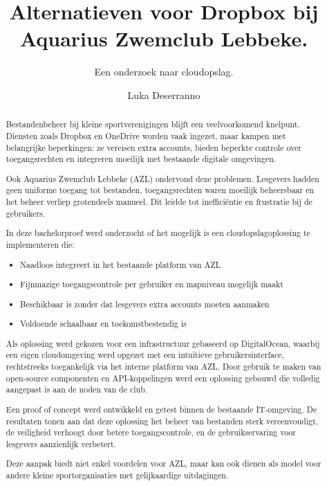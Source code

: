 \documentclass[a0,portrait]{hogent-poster}
\title{Alternatieven voor Dropbox bij Aquarius Zwemclub Lebbeke.}
\subtitle{Een onderzoek naar cloudopslag.}
\author{Luka Deserranno}
\begin{document}
\maketitle

\begin{abstract}
Bestandenbeheer bij kleine sportverenigingen blijft een veelvoorkomend knelpunt. Diensten zoals Dropbox en OneDrive worden vaak ingezet, maar kampen met belangrijke beperkingen: ze vereisen extra accounts, bieden beperkte controle over toegangsrechten en integreren moeilijk met bestaande digitale omgevingen.

Ook Aquarius Zwemclub Lebbeke (AZL) ondervond deze problemen. Lesgevers hadden geen uniforme toegang tot bestanden, toegangsrechten waren moeilijk beheersbaar en het beheer verliep grotendeels manueel. Dit leidde tot inefficiëntie en frustratie bij de gebruikers.

In deze bachelorproef werd onderzocht of het mogelijk is een cloudopslagoplossing te implementeren die:
\begin{itemize}
\item Naadloos integreert in het bestaande platform van AZL
\item Fijnmazige toegangscontrole per gebruiker en mapniveau mogelijk maakt
\item Beschikbaar is zonder dat lesgevers extra accounts moeten aanmaken
\item Voldoende schaalbaar en toekomstbestendig is
\end{itemize}

Als oplossing werd gekozen voor een infrastructuur gebaseerd op DigitalOcean, waarbij een eigen cloudomgeving werd opgezet met een intuïtieve gebruikersinterface, rechtstreeks toegankelijk via het interne platform van AZL. Door gebruik te maken van open-source componenten en API-koppelingen werd een oplossing gebouwd die volledig aangepast is aan de noden van de club.

Een proof of concept werd ontwikkeld en getest binnen de bestaande IT-omgeving. De resultaten tonen aan dat deze oplossing het beheer van bestanden sterk vereenvoudigt, de veiligheid verhoogt door betere toegangscontrole, en de gebruikservaring voor lesgevers aanzienlijk verbetert.

Deze aanpak biedt niet enkel voordelen voor AZL, maar kan ook dienen als model voor andere kleine sportorganisaties met gelijkaardige uitdagingen.

\end{abstract}
\end{document}
